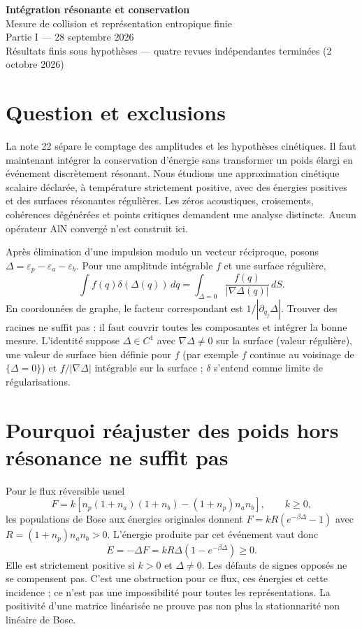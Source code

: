 \documentclass[11pt,a4paper]{article}
\begin{document}
\begin{center}
{\Large\bfseries Intégration résonante et conservation}\\[4pt]
{\normalsize Mesure de collision et représentation entropique finie}\\[2pt]
{\small Partie I --- 28 septembre 2026}\\[2pt]
{\small Résultats finis sous hypothèses --- quatre revues indépendantes terminées (2 octobre 2026)}
\end{center}

\section{Question et exclusions}
La note 22 sépare le comptage des amplitudes et les hypothèses cinétiques.
Il faut maintenant intégrer la conservation d'énergie sans transformer
un poids élargi en événement discrètement résonant.
Nous étudions une approximation cinétique scalaire déclarée, à température
strictement positive, avec des énergies positives et des surfaces
résonantes régulières. Les zéros acoustiques, croisements, cohérences
dégénérées et points critiques demandent une analyse distincte.
Aucun opérateur AlN convergé n'est construit ici.

Après élimination d'une impulsion modulo un vecteur réciproque, posons
$\Delta=\varepsilon_p-\varepsilon_a-\varepsilon_b$.
Pour une amplitude intégrable $f$ et une surface régulière,
\[
 \int f(q)\delta(\Delta(q))\,dq
 =\int_{\Delta=0}\frac{f(q)}{|\nabla\Delta(q)|}\,dS.
\]
En coordonnées de graphe, le facteur correspondant est
$1/|\partial_{q_j}\Delta|$. Trouver des racines ne suffit pas :
il faut couvrir toutes les composantes et intégrer la bonne mesure.
L'identité suppose $\Delta\in C^1$ avec $\nabla\Delta\ne0$ sur la
surface (valeur régulière), une valeur de surface bien définie pour $f$
(par exemple $f$ continue au voisinage de $\{\Delta=0\}$) et
$f/|\nabla\Delta|$ intégrable sur la surface ; $\delta$ s'entend comme
limite de régularisations.

\section{Pourquoi réajuster des poids hors résonance ne suffit pas}
Pour le flux réversible usuel
\[
 F=k[n_p(1+n_a)(1+n_b)-(1+n_p)n_an_b],\qquad k\ge0,
\]
les populations de Bose aux énergies originales donnent
$F=kR(e^{-\beta\Delta}-1)$ avec $R=(1+n_p)n_an_b>0$.
L'énergie produite par cet événement vaut donc
\[
 \dot E=-\Delta F
       =kR\Delta(1-e^{-\beta\Delta})\ge0.
\]
Elle est strictement positive si $k>0$ et $\Delta\ne0$.
Les défauts de signes opposés ne se compensent pas.
C'est une obstruction pour ce flux, ces énergies et cette incidence ;
ce n'est pas une impossibilité pour toutes les représentations.
La positivité d'une matrice linéarisée ne prouve pas non plus
la stationnarité non linéaire de Bose.
\end{document}

